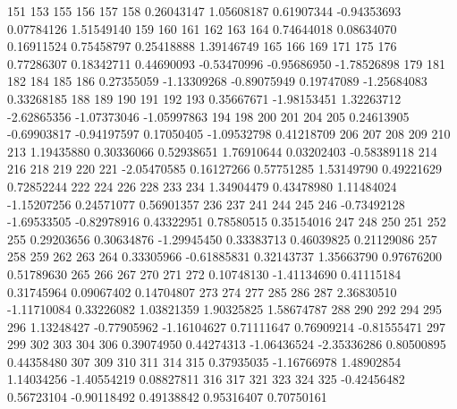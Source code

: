 \documentclass{article}
\begin{document}
\begin{Schunk}
\begin{Soutput}
        151         153         155         156         157         158 
 0.26043147  1.05608187  0.61907344 -0.94353693  0.07784126  1.51549140 
        159         160         161         162         163         164 
 0.74644018  0.08634070  0.16911524  0.75458797  0.25418888  1.39146749 
        165         166         169         171         175         176 
 0.77286307  0.18342711  0.44690093 -0.53470996 -0.95686950 -1.78526898 
        179         181         182         184         185         186 
 0.27355059 -1.13309268 -0.89075949  0.19747089 -1.25684083  0.33268185 
        188         189         190         191         192         193 
 0.35667671 -1.98153451  1.32263712 -2.62865356 -1.07373046 -1.05997863 
        194         198         200         201         204         205 
 0.24613905 -0.69903817 -0.94197597  0.17050405 -1.09532798  0.41218709 
        206         207         208         209         210         213 
 1.19435880  0.30336066  0.52938651  1.76910644  0.03202403 -0.58389118 
        214         216         218         219         220         221 
-2.05470585  0.16127266  0.57751285  1.53149790  0.49221629  0.72852244 
        222         224         226         228         233         234 
 1.34904479  0.43478980  1.11484024 -1.15207256  0.24571077  0.56901357 
        236         237         241         244         245         246 
-0.73492128 -1.69533505 -0.82978916  0.43322951  0.78580515  0.35154016 
        247         248         250         251         252         255 
 0.29203656  0.30634876 -1.29945450  0.33383713  0.46039825  0.21129086 
        257         258         259         262         263         264 
 0.33305966 -0.61885831  0.32143737  1.35663790  0.97676200  0.51789630 
        265         266         267         270         271         272 
 0.10748130 -1.41134690  0.41115184  0.31745964  0.09067402  0.14704807 
        273         274         277         285         286         287 
 2.36830510 -1.11710084  0.33226082  1.03821359  1.90325825  1.58674787 
        288         290         292         294         295         296 
 1.13248427 -0.77905962 -1.16104627  0.71111647  0.76909214 -0.81555471 
        297         299         302         303         304         306 
 0.39074950  0.44274313 -1.06436524 -2.35336286  0.80500895  0.44358480 
        307         309         310         311         314         315 
 0.37935035 -1.16766978  1.48902854  1.14034256 -1.40554219  0.08827811 
        316         317         321         323         324         325 
-0.42456482  0.56723104 -0.90118492  0.49138842  0.95316407  0.70750161 

\end{Soutput}
\end{Schunk}
\end{document}
